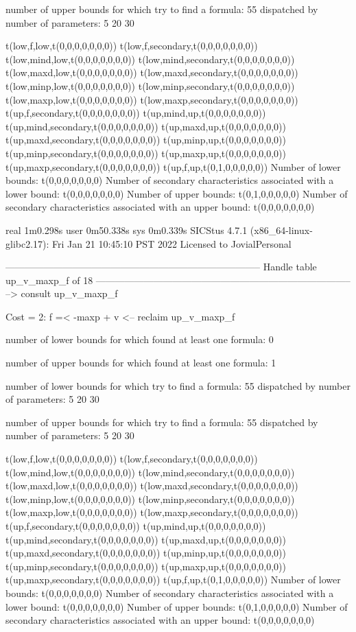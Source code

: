 number of upper bounds for which try to find a formula: 55
dispatched by number of parameters: 5  20  30

t(low,f,low,t(0,0,0,0,0,0,0))
t(low,f,secondary,t(0,0,0,0,0,0,0))
t(low,mind,low,t(0,0,0,0,0,0,0))
t(low,mind,secondary,t(0,0,0,0,0,0,0))
t(low,maxd,low,t(0,0,0,0,0,0,0))
t(low,maxd,secondary,t(0,0,0,0,0,0,0))
t(low,minp,low,t(0,0,0,0,0,0,0))
t(low,minp,secondary,t(0,0,0,0,0,0,0))
t(low,maxp,low,t(0,0,0,0,0,0,0))
t(low,maxp,secondary,t(0,0,0,0,0,0,0))
t(up,f,secondary,t(0,0,0,0,0,0,0))
t(up,mind,up,t(0,0,0,0,0,0,0))
t(up,mind,secondary,t(0,0,0,0,0,0,0))
t(up,maxd,up,t(0,0,0,0,0,0,0))
t(up,maxd,secondary,t(0,0,0,0,0,0,0))
t(up,minp,up,t(0,0,0,0,0,0,0))
t(up,minp,secondary,t(0,0,0,0,0,0,0))
t(up,maxp,up,t(0,0,0,0,0,0,0))
t(up,maxp,secondary,t(0,0,0,0,0,0,0))
t(up,f,up,t(0,1,0,0,0,0,0))
Number of lower bounds:                                             t(0,0,0,0,0,0,0)
Number of secondary characteristics associated with a lower bound:  t(0,0,0,0,0,0,0)
Number of upper bounds:                                             t(0,1,0,0,0,0,0)
Number of secondary characteristics associated with an upper bound: t(0,0,0,0,0,0,0)

real	1m0.298s
user	0m50.338s
sys	0m0.339s
SICStus 4.7.1 (x86_64-linux-glibc2.17): Fri Jan 21 10:45:10 PST 2022
Licensed to JovialPersonal


--------------------------------------------------------------------------------
Handle table up_v_maxp_f of 18
--------------------------------------------------------------------------------
--> consult up_v_maxp_f

Cost =  2:  f =< -maxp + v
<-- reclaim up_v_maxp_f

number of lower bounds for which found at least one formula: 0

number of upper bounds for which found at least one formula: 1

number of lower bounds for which try to find a formula: 55
dispatched by number of parameters: 5  20  30

number of upper bounds for which try to find a formula: 55
dispatched by number of parameters: 5  20  30

t(low,f,low,t(0,0,0,0,0,0,0))
t(low,f,secondary,t(0,0,0,0,0,0,0))
t(low,mind,low,t(0,0,0,0,0,0,0))
t(low,mind,secondary,t(0,0,0,0,0,0,0))
t(low,maxd,low,t(0,0,0,0,0,0,0))
t(low,maxd,secondary,t(0,0,0,0,0,0,0))
t(low,minp,low,t(0,0,0,0,0,0,0))
t(low,minp,secondary,t(0,0,0,0,0,0,0))
t(low,maxp,low,t(0,0,0,0,0,0,0))
t(low,maxp,secondary,t(0,0,0,0,0,0,0))
t(up,f,secondary,t(0,0,0,0,0,0,0))
t(up,mind,up,t(0,0,0,0,0,0,0))
t(up,mind,secondary,t(0,0,0,0,0,0,0))
t(up,maxd,up,t(0,0,0,0,0,0,0))
t(up,maxd,secondary,t(0,0,0,0,0,0,0))
t(up,minp,up,t(0,0,0,0,0,0,0))
t(up,minp,secondary,t(0,0,0,0,0,0,0))
t(up,maxp,up,t(0,0,0,0,0,0,0))
t(up,maxp,secondary,t(0,0,0,0,0,0,0))
t(up,f,up,t(0,1,0,0,0,0,0))
Number of lower bounds:                                             t(0,0,0,0,0,0,0)
Number of secondary characteristics associated with a lower bound:  t(0,0,0,0,0,0,0)
Number of upper bounds:                                             t(0,1,0,0,0,0,0)
Number of secondary characteristics associated with an upper bound: t(0,0,0,0,0,0,0)

